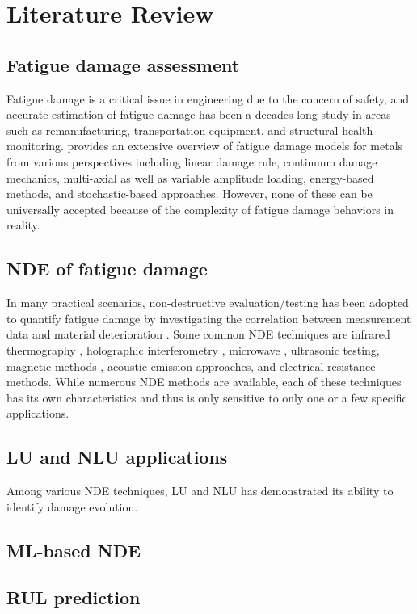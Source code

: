 \chapter{Literature Review}
\label{chap: litrev}

\section{Fatigue damage assessment}
Fatigue damage is a critical issue in engineering due to the concern of safety, and accurate estimation of fatigue damage has been a decades-long study in areas such as remanufacturing, transportation equipment, and structural health monitoring. \cite{fatigue-review-Santecchia2016} provides an extensive overview of fatigue damage models for metals from various perspectives including linear damage rule, continuum damage mechanics, multi-axial as well as variable amplitude loading, energy-based methods, and stochastic-based approaches. However, none of these can be universally accepted because of the complexity of fatigue damage behaviors in reality.

\section{NDE of fatigue damage}
In many practical scenarios, non-destructive evaluation/testing has been adopted to quantify fatigue damage by investigating the correlation between measurement data and material deterioration \cite{nde-review-ACHENBACH200013}. Some common NDE techniques are infrared thermography \cite{nde-thermo-FAN20121}, holographic interferometry \cite{nde-dic}, microwave \cite{nde-microwave}, ultrasonic testing, magnetic methods \cite{nde-magnetic}, acoustic emission approaches, and electrical resistance methods. While numerous NDE methods are available, each of these techniques has its own characteristics and thus is only sensitive to only one or a few specific applications.

\section{LU and NLU applications}
Among various NDE techniques, LU and NLU has demonstrated its ability to identify damage evolution.

\section{ML-based NDE}
\section{RUL prediction}